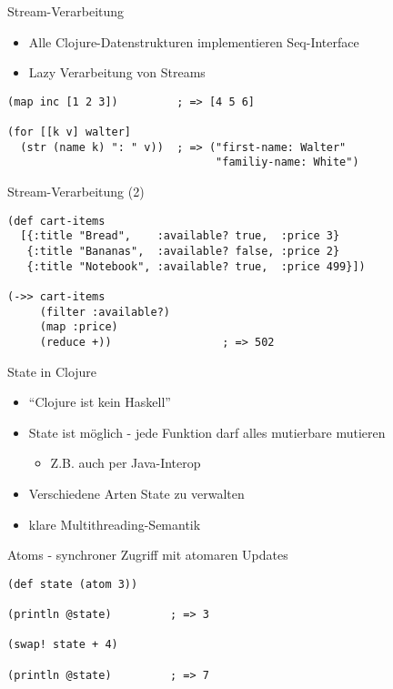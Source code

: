 \documentclass[presentation]{beamer}
\begin{document}
\begin{frame}[fragile]{Stream-Verarbeitung}
  \begin{itemize}
  \item Alle Clojure-Datenstrukturen implementieren Seq-Interface
  \item Lazy Verarbeitung von Streams
  \end{itemize}
  \begin{block}{}
\begin{verbatim}
(map inc [1 2 3])         ; => [4 5 6]

(for [[k v] walter]
  (str (name k) ": " v))  ; => ("first-name: Walter"
                                "familiy-name: White")

\end{verbatim}
  \end{block}
\end{frame}

\begin{frame}[fragile]{Stream-Verarbeitung (2)}
  \begin{block}{}
\begin{verbatim}
(def cart-items
  [{:title "Bread",    :available? true,  :price 3}
   {:title "Bananas",  :available? false, :price 2}
   {:title "Notebook", :available? true,  :price 499}])

(->> cart-items
     (filter :available?)
     (map :price)
     (reduce +))                 ; => 502

\end{verbatim}
  \end{block}
\end{frame}

\begin{frame}[fragile]{State in Clojure}
  \begin{itemize}
  \item ``Clojure ist kein Haskell''
  \item State ist möglich - jede Funktion darf alles mutierbare mutieren
    \begin{itemize}
    \item Z.B. auch per Java-Interop
    \end{itemize}
  \item Verschiedene Arten State zu verwalten
  \item klare Multithreading-Semantik
  \end{itemize}
  \begin{block}{Atoms - synchroner Zugriff mit atomaren Updates}
\begin{verbatim}
(def state (atom 3))

(println @state)         ; => 3

(swap! state + 4)

(println @state)         ; => 7
\end{verbatim}
  \end{block}
\end{frame}
\end{document}
